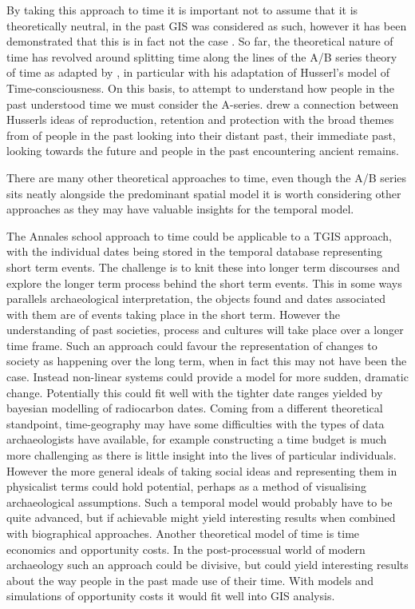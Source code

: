 By taking this approach to time it is important not to assume that it is theoretically neutral, in the past GIS was considered as such, however it has been demonstrated that this is in fact not the case \citep{Wheatley:1993qf}. So far, the theoretical nature of time has revolved around splitting time along the lines of the A/B series theory of time as adapted by \citet{Gell:1992fk}, in particular with his adaptation of Husserl's model of Time-consciousness. On this basis, to attempt to understand how people in the past understood time we must consider the A-series. \citet{Green:2008fk} drew a connection between Husserls ideas of reproduction, retention and protection with the broad themes from \citet{Bradley:2002fk} of people in the past looking into their distant past, their immediate past, looking towards the future and people in the past encountering ancient remains. 

There are many other theoretical approaches to time, even though the A/B series sits neatly alongside the predominant spatial model it is worth considering other approaches as they may have valuable insights for the temporal model.

The Annales school approach to time could be applicable to a TGIS approach, with the individual dates being stored in the temporal database representing short term events. The challenge is to knit these into longer term discourses and explore the longer term process behind the short term events. This in some ways parallels archaeological interpretation, the objects found and dates associated with them are of events taking place in the short term. However the understanding of past societies, process and cultures will take place over a longer time frame. Such an approach could favour the representation of changes to society as happening over the long term, when in fact this may not have been the case. Instead non-linear systems could provide a model for more sudden, dramatic change. Potentially this could fit well with the tighter date ranges yielded by bayesian modelling of radiocarbon dates.  Coming from a different theoretical standpoint, time-geography may have some difficulties with the types of data archaeologists have available, for example constructing a time budget is much more challenging as there is little insight into the lives of particular individuals. However the more general ideals of taking social ideas and representing them in physicalist terms could hold potential, perhaps as a method of visualising archaeological assumptions. Such a temporal model would probably have to be quite advanced, but if achievable might yield interesting results when combined with biographical approaches. Another theoretical model of time is time economics and opportunity costs. In the post-processual world of modern archaeology such an approach could be divisive, but could yield interesting results about the way people in the past made use of their time. With models and simulations of opportunity costs it would fit well into GIS analysis. 

